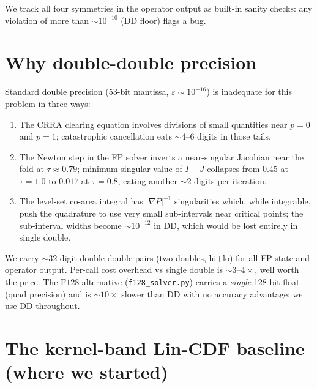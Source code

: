 \documentclass[11pt]{article}
\begin{document}
We track all four symmetries in the operator output as built-in
sanity checks: any violation of more than $\sim 10^{-10}$ (DD floor)
flags a bug.

\section{Why double-double precision}

Standard double precision (53-bit mantissa, $\varepsilon \sim 10^{-16}$)
is inadequate for this problem in three ways:

\begin{enumerate}\itemsep1pt
  \item The CRRA clearing equation involves divisions of small
        quantities near $p = 0$ and $p = 1$; catastrophic cancellation
        eats $\sim 4$--$6$ digits in those tails.
  \item The Newton step in the FP solver inverts a near-singular
        Jacobian near the fold at $\tau \approx 0.79$; minimum singular
        value of $I - J$ collapses from $0.45$ at $\tau = 1.0$ to
        $0.017$ at $\tau = 0.8$, eating another $\sim 2$ digits per
        iteration.
  \item The level-set co-area integral has $|\nabla P|^{-1}$ singularities
        which, while integrable, push the quadrature to use very small
        sub-intervals near critical points; the sub-interval widths
        become $\sim 10^{-12}$ in DD, which would be lost entirely in
        single double.
\end{enumerate}

We carry $\sim 32$-digit double-double pairs (two doubles, hi+lo) for
all FP state and operator output. Per-call cost overhead vs single
double is $\sim 3$--$4{\times}$, well worth the price. The
$\mathrm{F128}$ alternative (\texttt{f128\_solver.py}) carries a
\emph{single} 128-bit float (quad precision) and is $\sim 10{\times}$
slower than DD with no accuracy advantage; we use DD throughout.

\section{The kernel-band Lin-CDF baseline (where we started)}
\end{document}
